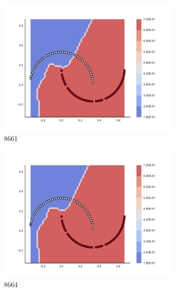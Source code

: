 \begin{figure}[h]
\begin{subfigure}[b]{0.09\textwidth}
    \includegraphics[clip, trim=2.35cm 1.75cm 4.5cm 0cm,width=\textwidth]{img/convergence/8661.pdf}
    \caption{8661}
    \label{fig:convergence_8661}
\end{subfigure}
%
\begin{subfigure}[b]{0.09\textwidth}
    \includegraphics[clip, trim=2.35cm 1.75cm 4.5cm 0cm,width=\textwidth]{img/convergence/8664.pdf}
    \caption{8664}
    \label{fig:convergence_8664}
\end{subfigure}
%
\begin{subfigure}[b]{0.09\textwidth}

\end{subfigure}
\end{figure}
